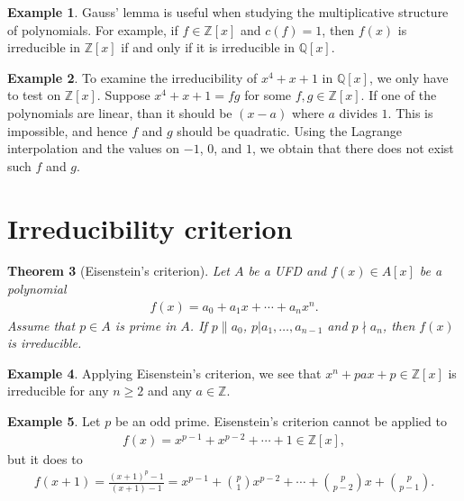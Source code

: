\documentclass[12pt]{report}
\theoremstyle{plain}
\newtheorem{theorem}{Theorem}[section]
\theoremstyle{remark}
\theoremstyle{definition}
\newtheorem{example}[theorem]{Example}
\newcommand{\Z}{\mathbb{Z}}
\newcommand{\Q}{\mathbb{Q}}
\begin{document}
\begin{example}
    Gauss' lemma is useful when studying the multiplicative structure of polynomials. For example, if $f\in \Z[x]$ and $c(f)=1$, then $f(x)$ is irreducible in $\Z[x]$ if and only if it is irreducible in $\Q[x]$.
\end{example}

\begin{example}
    To examine the irreducibility of $x^4+x+1$ in $\Q[x]$, we only have to test on $\Z[x]$. Suppose $x^4+x+1=fg$ for some $f,g\in \Z[x]$. If one of the polynomials are linear, than it should be $(x-a)$ where $a$ divides $1$. This is impossible, and hence $f$ and $g$ should be quadratic. Using the Lagrange interpolation and the values on $-1$, $0$, and $1$, we obtain that there does not exist such $f$ and $g$.
\end{example}


\clearpage
\section{Irreducibility criterion}
\begin{theorem}[Eisenstein's criterion]
    Let $A$ be a UFD and $f(x)\in A[x]$ be a polynomial
    \begin{align*}
        f(x) = a_0 + a_1x + \cdots + a_n x^n.
    \end{align*}
    Assume that $p\in A$ is prime in $A$. If $p\|a_0$, $p|a_1,\dots,a_{n-1}$ and $p\nmid a_n$, then $f(x)$ is irreducible.
\end{theorem}

\begin{example}
    Applying Eisenstein's criterion, we see that $x^n + pax +p\in\Z[x]$ is irreducible for any $n\ge 2$ and any $a\in\Z$.
\end{example}

\begin{example}
    Let $p$ be an odd prime. Eisenstein's criterion cannot be applied to
    \begin{align*}
        f(x)=x^{p-1}+x^{p-2}+\cdots+1\in \Z[x],
    \end{align*}
    but it does to
    \begin{align*}
        f(x+1) = \frac{(x+1)^p - 1}{(x+1)-1} = x^{p-1} + {p\choose 1}x^{p-2} + \cdots + {p\choose p-2} x + {p\choose p-1}.
    \end{align*}
\end{example}
\end{document}
